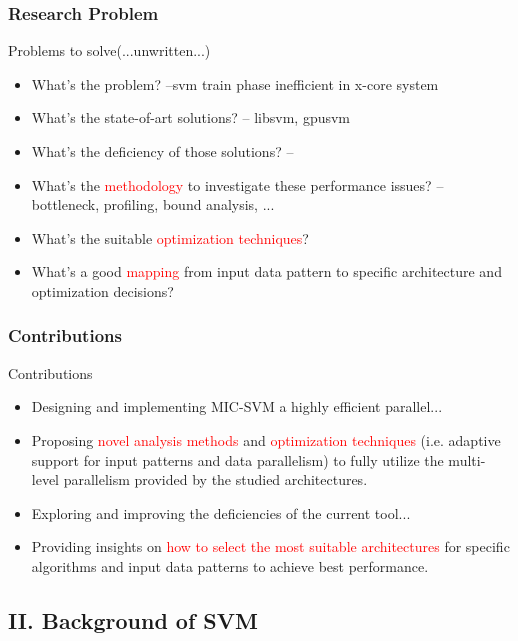 \documentclass{beamer}
\begin{document}
\begin{frame}
	\frametitle{Research Problem}
	\begin{block}{Problems to solve(...unwritten...)}
		\begin{itemize}
			\item What's the problem? --svm train phase inefficient in x-core system
			\item What's the state-of-art solutions? -- libsvm, gpusvm
			\item What's the deficiency of those solutions? -- 
			\item What's the \textcolor{red}{methodology} to investigate these performance issues? -- bottleneck, profiling, bound analysis, ...
			\item What's the suitable \textcolor{red}{optimization techniques}?
			\item What's a good \textcolor{red}{mapping} from input data pattern to specific architecture and optimization decisions?
		\end{itemize}		
	\end{block}
	
\end{frame}

\begin{frame}
	\frametitle{Contributions}
	\begin{block}{Contributions}
		\begin{itemize}
			\item Designing and implementing MIC-SVM a highly efficient parallel...
			\item Proposing \textcolor{red}{novel analysis methods} and \textcolor{red}{optimization techniques}
			(i.e. adaptive support for input patterns and data parallelism) to
			fully utilize the multi-level parallelism provided by the studied
			architectures.
			\item Exploring and improving the deficiencies of the current tool...
			\item Providing insights on \textcolor{red}{how to select the most suitable architectures} for specific algorithms and input data patterns to achieve
			best performance.
		\end{itemize}		
	\end{block}
	
\end{frame}

\subsection{II. Background of SVM} %
\end{document}
